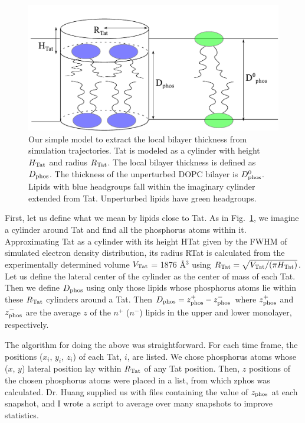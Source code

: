 \begin{figure}[htbp]
  \centering
  \includegraphics[scale=0.7]{./figures/Tat/MMs/cylinder_model}
  \caption[Our simple model to extract the local bilayer thickness from 
  simulation trajectories]
  {Our simple model to extract the local bilayer thickness from 
  simulation trajectories. Tat is modeled as a cylinder with height $H_\textrm{Tat}$ 
  and radius $R_\textrm{Tat}$. The local bilayer thickness is defined as $D_\text{phos}$. 
  The thickness of the unperturbed DOPC bilayer is $D_\text{phos}^0$. 
  Lipids with blue headgroups fall within the imaginary cylinder extended from
  Tat. Unperturbed lipids have green headgroups.}
  \label{fig:cylinder_model}
\end{figure}
 
First, let us define what we mean by lipids close to Tat.  
As in Fig.~\ref{fig:cylinder_model}, we imagine a cylinder around Tat and 
find all the phosphorus atoms within it. 
Approximating Tat as a cylinder 
with its height \gls{HTat} given by the FWHM of simulated electron density distribution, 
its radius \gls{RTat} is calculated from the experimentally determined volume $V_\textrm{Tat}$ = 1876 \AA$^3$ 
using $R_\textrm{Tat}=\sqrt{V_\textrm{Tat}/(\pi H_\textrm{Tat})}$. 
Let us define the lateral center of the cylinder as the center of mass of each
Tat. Then we define $D_\text{phos}$ using only those lipids whose 
phosphorus atoms lie within these $R_\textrm{Tat}$ cylinders around a Tat. 
Then $D_\text{phos}= z_\textrm{phos}^+ - z_\textrm{phos}^-$ where $z_\textrm{phos}^+$ and $z_\textrm{phos}^-$ 
are the average $z$ of the $n^+$ ($n^-$) lipids in the upper and lower monolayer, respectively.  

The algorithm for doing the above was straightforward.  
For each time frame, the positions ($x_i$, $y_i$, $z_i$) of each Tat, $i$, are 
listed.   
We chose phosphorus atoms whose ($x$, $y$) lateral position lay within 
$R_\textrm{Tat}$ of any Tat position. Then, $z$ positions
of the chosen phosphorus atoms were placed in a list, from which
\gls{zphos} was calculated. 
Dr. Huang supplied us with files containing the value of $z_\textrm{phos}$ 
at each snapshot, and I wrote a script to average over many snapshots 
to improve statistics. 

